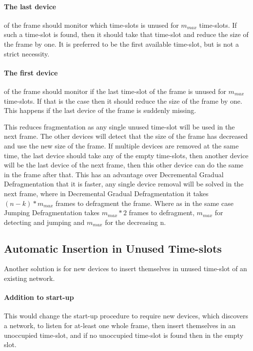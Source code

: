 \paragraph{The last device} of the frame should monitor which time-slots is unused for $m_{max}$ time-slots. 
If such a time-slot is found, then it should take that time-slot and reduce the size of the frame by one. 
It is preferred to be the first available time-slot, but is not a strict necessity.   

\paragraph{The first device} of the frame should monitor if the last time-slot of the frame is unused for $m_{max}$ time-slots.
If that is the case then it should reduce the size of the frame by one.
This happens if the last device of the frame is suddenly missing.


\bigskip

This reduces fragmentation as any single unused time-slot will be used in the next frame.
The other devices will detect that the size of the frame has decreased and use the new size of the frame. 
If multiple devices are removed at the same time, the last device should take any of the empty time-slots, then another device will be the last device of the next frame, then this other device can do the same in the frame after that. 
This has an advantage over Decremental Gradual Defragmentation that it is faster, any single device removal will be solved in the next frame, where in Decremental Gradual Defragmentation it takes $(n - k) * m_{max}$ frames to defragment the frame. 
Where as in the same case Jumping Defragmentation takes $m_{max} * 2$ frames to defragment, $m_{max}$ for detecting and jumping and $m_{max}$ for the decreasing n. 

\subsection{Automatic Insertion in Unused Time-slots}
Another solution is for new devices to insert themselves in unused time-slot of an existing network.

\paragraph{Addition to start-up}
This would change the start-up procedure to require new devices, which discovers a network, to listen for at-least one whole frame, then insert themselves in an unoccupied time-slot, and if no unoccupied time-slot is found then in the empty slot. 

